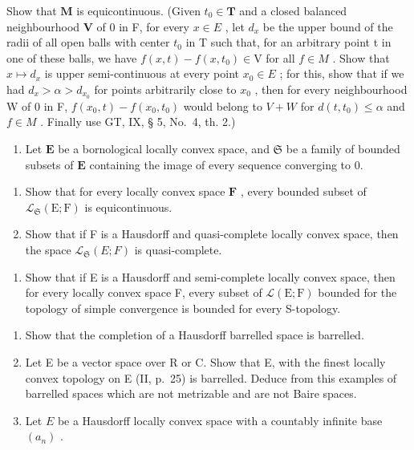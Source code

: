Show that \(\mathbf{M}\) is equicontinuous. (Given \(t_0 \in \mathbf{T}\) and a closed balanced neighbourhood \(\mathbf{V}\) of 0 in F, for every \(x \in E\) , let \(d_{x}\) be the upper bound of the radii of all open balls with center \(t_{0}\) in T such that, for an arbitrary point t in one of these balls, we have \(f(x, t) - f(x, t_{0}) \in \mathrm{V}\) for all \(f \in M\) . Show that \(x \mapsto d_{x}\) is upper semi-continuous at every point \(x_{0} \in E\) ; for this, show that if we had \(d_{x} > \alpha > d_{x_{0}}\) for points arbitrarily close to \(x_{0}\) , then for every neighbourhood W of 0 in F, \(f(x_{0}, t) - f(x_{0}, t_{0})\) would belong to \(V + W\) for \(d(t, t_{0}) \leqslant \alpha\) and \(f \in M\) . Finally use GT, IX, § 5, No.~4, th. 2.)

\begin{enumerate}
\def\labelenumi{\arabic{enumi})}
\setcounter{enumi}{11}
\tightlist
\item
  Let \(\mathbf{E}\) be a bornological locally convex space, and \(\mathfrak{S}\) be a family of bounded subsets of \(\mathbf{E}\) containing the image of every sequence converging to 0.
\end{enumerate}

\begin{enumerate}
\def\labelenumi{\alph{enumi})}
\item
  Show that for every locally convex space \(\mathbf{F}\) , every bounded subset of \(\mathcal{L}_{\mathfrak{S}}(\mathrm{E};\mathrm{F})\) is equicontinuous.
\item
  Show that if F is a Hausdorff and quasi-complete locally convex space, then the space \(\mathcal{L}_{\mathfrak{S}}(E;F)\) is quasi-complete.
\end{enumerate}

\begin{enumerate}
\def\labelenumi{\arabic{enumi})}
\setcounter{enumi}{12}
\tightlist
\item
  Show that if E is a Hausdorff and semi-complete locally convex space, then for every locally convex space F, every subset of \(\mathcal{L}(\mathrm{E};\mathrm{F})\) bounded for the topology of simple convergence is bounded for every S-topology.
\end{enumerate}

\exercisegroup

\begin{enumerate}
\def\labelenumi{\arabic{enumi})}
\item
  Show that the completion of a Hausdorff barrelled space is barrelled.
\item
  Let E be a vector space over R or C. Show that E, with the finest locally convex topology on E (II, p.~25) is barrelled. Deduce from this examples of barrelled spaces which are not metrizable and are not Baire spaces.
\item
  Let \(E\) be a Hausdorff locally convex space with a countably infinite base \((a_{n})\) .
\end{enumerate}

